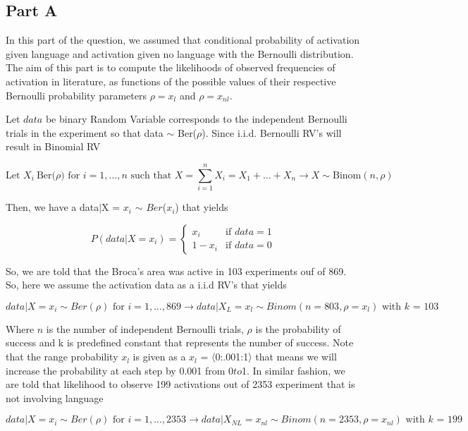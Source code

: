 \documentclass[12pt]{amsart}
\begin{document}
\subsection{Part A}
In this part of the question, we assumed that conditional probability of activation given language and activation given no language with the Bernoulli distribution. The aim of this part is to compute the likelihoods of observed frequencies of activation in literature, as functions of the possible values of their respective Bernoulli probability parameters $\rho = x_l$ and $\rho = x_{nl}$.

\bigskip
Let $data$ be binary Random Variable corresponds to the independent Bernoulli trials in the experiment so that data $\sim$ Ber($\rho$). Since i.i.d. Bernoulli RV’s will result in Binomial RV


\begin{equation}
    \text{Let } X_i ~ \text{Ber(}\rho) \text{ for $i = 1,…,n$ such that } X = \sum_{i=1}^n X_i  = X_1 + … + X_n \rightarrow  X \sim \text{Binom}(n,\rho)
\end{equation}

Then, we have a data$\mid$X = $x_i$ $\sim$ $Ber$($x_i$) that yields

\begin{equation}
  P(data|X=x_i) =
  \begin{cases}
    x_i     & \text{if $data = 1$} \\
    1 - x_i & \text{if $data = 0$}
\end{cases}
\end{equation}


So, we are told that the Broca’s area was active in 103 experiments ouf of 869. So, here we assume the activation data as a i.i.d RV’s that yields

\[
data|X= x_i \sim Ber(\rho) \text{ for }i=1,…,869 \rightarrow data|X_{L}= x_l  \sim Binom(n=803,\rho= x_l) \text{ with $k$ = 103} 
\]

Where $n$ is the number of independent Bernoulli trials, $\rho$ is the probability of success and k is predefined constant that represents the number of success. Note that the range probability $x_l$ is given as a $x_l$ = 〈0:.001:1〉 that means we will increase the probability at each step by $0.00$1 from $0 to $1. In similar fashion, we are told that likelihood to observe 199 activations out of 2353 experiment that is not involving language

\[
data|X= x_i \sim Ber(\rho) \text{ for }i=1,…,2353 \rightarrow data|X_{NL}= x_{nl}  \sim Binom(n=2353,\rho= x_{nl}) \text{ with $k$ = 199} 
\]
\end{document}
